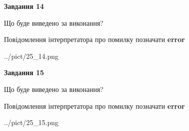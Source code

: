 \documentclass[11pt, ukrainian]{article}
\begin{document}
{\begin {large}
{\begin {center}\textbf{Завдання 14}\end {center}}\par
Що буде виведено за виконання? \par
Повідомлення інтерпретатора про помилку позначати \textbf{error}

\begin{center}
	{../pict/25_14.png}
\end{center}
\newpage

{\begin {center}\textbf{Завдання 15}\end {center}}\par
Що буде виведено за виконання? \par
Повідомлення інтерпретатора про помилку позначати \textbf{error}

\begin{center}
	{../pict/25_15.png}
\end{center}
\newpage

\end {large}}
\end{document}

